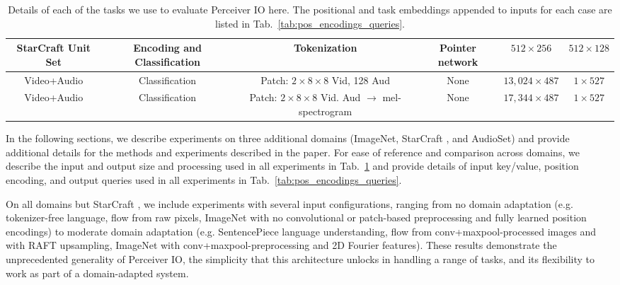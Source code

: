 \documentclass{article} %
\newcommand{\ourmodel}{Perceiver IO\xspace}
\begin{document}
\begin{table}[h]
{\begin{tabular}{cccccc}
 StarCraft Unit Set & Encoding and Classification & Tokenization & Pointer network & $512\times256$ & $512\times128$ \\ \midrule
 Video+Audio & Classification & Patch: $2\times8\times8$ Vid, 128 Aud & None & $13,024\times487$ & $1\times527$ \\
 Video+Audio & Classification & Patch: $2\times8\times8$ Vid. Aud $\rightarrow$ mel-spectrogram      & None & $17,344\times487$ & $1\times527$ \\ 
 \bottomrule
\end{tabular}}
\vspace{1mm}
\caption{\small \label{tab:input_output_details} Details of each of the tasks we use to evaluate \ourmodel{} here. The positional and task embeddings appended to inputs for each case are listed in Tab.~\ref{tab:pos_encodings_queries}.}
\end{table}

In the following sections, we describe experiments on three additional domains (ImageNet, StarCraft , and AudioSet) and provide additional details for the methods and experiments described in the paper. For ease of reference and comparison across domains, we describe the input and output size and processing used in all experiments in Tab.~\ref{tab:input_output_details} and provide details of input key/value, position encoding, and output queries used in all experiments in Tab.~\ref{tab:pos_encodings_queries}. 

On all domains but StarCraft , we include experiments with several input configurations, ranging from no domain adaptation (e.g. tokenizer-free language, flow from raw pixels, ImageNet with no convolutional or patch-based preprocessing and fully learned position encodings) to moderate domain adaptation (e.g. SentencePiece language understanding, flow from conv+maxpool-processed images and with RAFT upsampling, ImageNet with conv+maxpool-preprocessing and 2D Fourier features). These results demonstrate the unprecedented generality of \ourmodel{}, the simplicity that this architecture unlocks in handling a range of tasks, and its flexibility to work as part of a domain-adapted system. %
\end{document}
